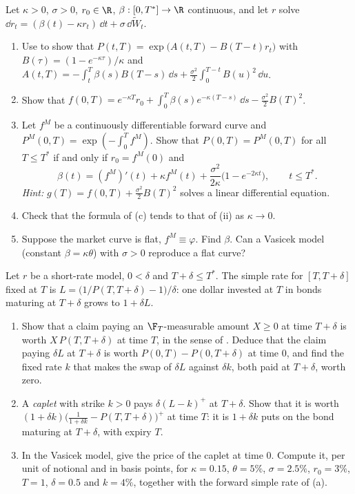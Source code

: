 \begin{exercise}\label{ex:ir-hull-white}
\medium Let $\kappa>0$, $\sigma>0$, $r_0\in\R$, $\beta:[0,T^*]\to\R$ continuous, and let $r$ solve
$\dd r_t=(\beta(t)-\kappa r_t)\,\dd t+\sigma\,\dd\widetilde W_t$.
\begin{enumerate}[label=(\alph*)]
  \item Use  to show that $P(t,T)=\exp\big(A(t,T)-B(T-t)r_t\big)$ with
    $B(\tau)=(1-e^{-\kappa\tau})/\kappa$ and
    $A(t,T)=-\int_t^T\beta(s)B(T-s)\,\dd s+\frac{\sigma^2}2\int_0^{T-t}B(u)^2\,\dd u$.
  \item Show that $f(0,T)=e^{-\kappa T}r_0+\int_0^T\beta(s)e^{-\kappa(T-s)}\,\dd s-\frac{\sigma^2}2B(T)^2$.
  \item Let $f^M$ be a continuously differentiable forward curve and
    $P^M(0,T)=\exp(-\int_0^Tf^M)$. Show that $P(0,T)=P^M(0,T)$ for all $T\le T^*$ if and only if
    $r_0=f^M(0)$ and
    \[
      \beta(t)=(f^M)'(t)+\kappa f^M(t)+\frac{\sigma^2}{2\kappa}\big(1-e^{-2\kappa t}\big),\qquad t\le T^*.
    \]
    \emph{Hint:} $g(T)=f(0,T)+\frac{\sigma^2}2B(T)^2$ solves a linear differential equation.
  \item Check that the formula of (c) tends to that of (ii) as $\kappa\to0$.
  \item Suppose the market curve is flat, $f^M\equiv\varphi$. Find $\beta$. Can a Vasicek model
    (constant $\beta=\kappa\theta$) with $\sigma>0$ reproduce a flat curve?
\end{enumerate}
\end{exercise}

\begin{exercise}\label{ex:ir-caplet}
\medium Let $r$ be a short-rate model, $0<\delta$ and $T+\delta\le T^*$. The simple rate for $[T,T+\delta]$
fixed at $T$ is $L=\big(1/P(T,T+\delta)-1\big)/\delta$: one dollar invested at $T$ in bonds maturing at
$T+\delta$ grows to $1+\delta L$.
\begin{enumerate}[label=(\alph*)]
  \item Show that a claim paying an $\F_T$-measurable amount $X\ge0$ at time $T+\delta$ is worth
    $X\,P(T,T+\delta)$ at time $T$, in the sense of . Deduce that the claim
    paying $\delta L$ at $T+\delta$ is worth $P(0,T)-P(0,T+\delta)$ at time $0$, and find the fixed rate
    $k$ that makes the swap of $\delta L$ against $\delta k$, both paid at $T+\delta$, worth zero.
  \item A \emph{caplet} with strike $k>0$ pays $\delta(L-k)^+$ at $T+\delta$. Show that it is worth
    $(1+\delta k)\big(\frac1{1+\delta k}-P(T,T+\delta)\big)^+$ at time $T$: it is $1+\delta k$ puts on the
    bond maturing at $T+\delta$, with expiry $T$.
  \item In the Vasicek model, give the price of the caplet at time $0$. Compute it, per unit of
    notional and in basis points, for $\kappa=0.15$, $\theta=5\%$, $\sigma=2.5\%$, $r_0=3\%$, $T=1$,
    $\delta=0.5$ and $k=4\%$, together with the forward simple rate of (a).
\end{enumerate}
\end{exercise}

